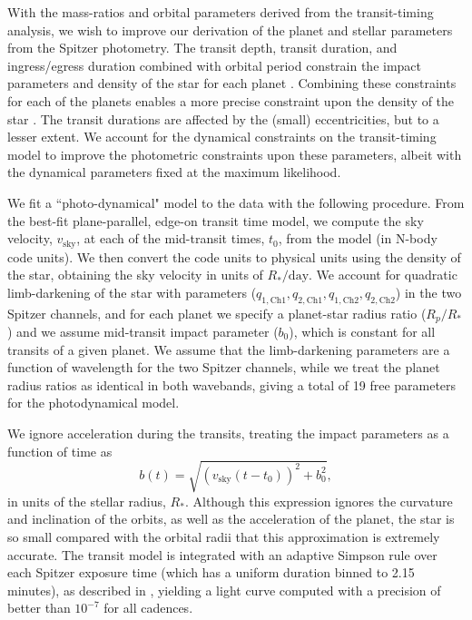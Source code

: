 \documentclass[twocolumn]{aastex63}
\begin{document}
With the mass-ratios and orbital parameters derived from the transit-timing
analysis, we wish to improve our derivation of the planet and stellar parameters 
from the Spitzer photometry.   The transit depth, transit duration, and ingress/egress 
duration combined with  orbital period constrain the impact parameters and density 
of the star for each planet \citep{Seager2003}.  Combining these constraints for 
each of the planets  enables a more precise constraint upon the density of the 
star \citep{Kipping2012a}.
The transit durations are affected by the (small) eccentricities, but to a lesser extent.  We account 
for the dynamical constraints on the transit-timing model to improve the
photometric constraints upon these parameters, albeit with the dynamical parameters fixed 
at the maximum likelihood.

We fit a ``photo-dynamical" model \citep{Carter2012} to the data with the following procedure.
From the best-fit plane-parallel, edge-on transit time model,
we compute the sky velocity, $v_\mathrm{sky}$, at each of the mid-transit times, $t_0$,
from the model (in N-body code units).  We then convert the code units to physical 
units using the density of the star, obtaining the sky velocity in units
of $R_*/\mathrm{day}$.
We account for quadratic limb-darkening of the star with parameters ($q_\mathrm{1,Ch1}, q_\mathrm{2,Ch1},q_\mathrm{1,Ch2},q_\mathrm{2,Ch2}$) in the two Spitzer channels, and for each
planet we specify a planet-star radius ratio ($R_p/R_*$) and we assume
mid-transit impact parameter ($b_0$), which is constant for all transits of
a given planet.  We assume that the limb-darkening parameters are a function
of wavelength for the two Spitzer channels, while we treat the planet radius
ratios as identical in both wavebands, giving a total of 19 free parameters
for the photodynamical model.

We ignore acceleration during the transits, treating the impact parameters as 
a function of time as
\begin{equation}
    b(t) = \sqrt{(v_\mathrm{sky} (t-t_0))^2 + b_0^2},
\end{equation}
in units of the stellar radius, $R_*$.
Although this expression ignores the curvature and inclination of the orbits, as well
as the acceleration of the planet, the star is so small compared with the orbital 
radii that this approximation is extremely accurate.  The transit model is integrated 
with an adaptive Simpson rule over each Spitzer exposure time (which has a uniform
duration binned to 2.15 minutes), as described in \citet{Agol2019}, yielding
a light curve computed with a precision of better than $10^{-7}$ for all cadences.
\end{document}

